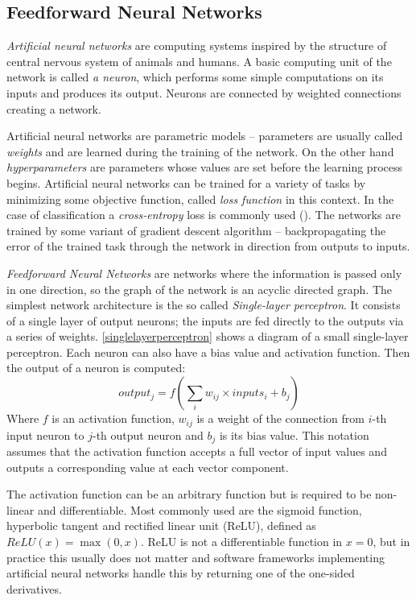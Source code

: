 \subsection{Feedforward Neural Networks}
\textit{Artificial neural networks} are computing systems inspired by the structure of central nervous system of animals and humans. A basic computing unit of the network is called \textit{a neuron}, which performs some simple computations on its inputs and produces its output. Neurons are connected by weighted connections creating a network. \par
Artificial neural networks are parametric models -- parameters are usually called \textit{weights} and are learned during the training of the network. On the other hand \textit{hyperparameters} are parameters whose values are set before the learning process begins. Artificial neural networks can be trained for a variety of tasks by minimizing some objective function, called \textit{loss function} in this context. In the case of classification a \textit{cross-entropy} loss is commonly used (\cite{goodfellow_deep_2016}). The networks are trained by some variant of gradient descent algorithm -- backpropagating the error of the trained task through the network in direction from outputs to inputs. \par
\textit{Feedforward Neural Networks} are networks where the information is passed only in one direction, so the graph of the network is an acyclic directed graph. The simplest network architecture is the so called \textit{Single-layer perceptron}. It consists of a single layer of output neurons; the inputs are fed directly to the outputs via a series of weights. \autoref{singlelayerperceptron} shows a diagram of a small single-layer perceptron. Each neuron can also have a bias value and activation function. Then the output of a neuron is computed: $$output_j = f(\sum_{i} {w_{ij}\times inputs_i + b_j})$$ Where $f$ is an activation function, $w_{ij}$ is a weight of the connection from $i$-th input neuron to $j$-th output neuron and $b_j$ is its bias value. This notation assumes that the activation function accepts a full vector of input values and outputs a corresponding value at each vector component.

The activation function can be an arbitrary function but is required to be non-linear and differentiable. Most commonly used are the sigmoid function, hyperbolic tangent and rectified linear unit (ReLU), defined as $ReLU(x) = \max(0,x)$. ReLU is not a differentiable function in $x=0$, but in practice this usually does not matter and software frameworks implementing artificial neural networks handle this by returning one of the one-sided derivatives.\par  
